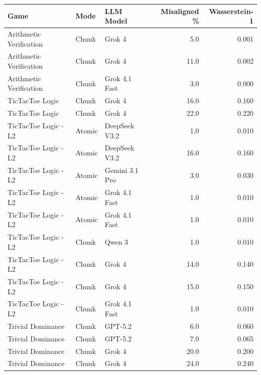 \normalsize
\setlength{\tabcolsep}{3pt}
\begin{tabular}{lllrr}
\toprule
Game & Mode & LLM Model & Misaligned \% & Wasserstein-1 \\
\midrule
Arithmetic Verification & Chunk & Grok 4 & 5.0 & 0.001 \\
Arithmetic Verification & Chunk & Grok 4 & 11.0 & 0.002 \\
Arithmetic Verification & Chunk & Grok 4.1 Fast & 3.0 & 0.000 \\
TicTacToe Logic & Chunk & Grok 4 & 16.0 & 0.160 \\
TicTacToe Logic & Chunk & Grok 4 & 22.0 & 0.220 \\
TicTacToe Logic - L2 & Atomic & DeepSeek V3.2 & 1.0 & 0.010 \\
TicTacToe Logic - L2 & Atomic & DeepSeek V3.2 & 16.0 & 0.160 \\
TicTacToe Logic - L2 & Atomic & Gemini 3.1 Pro & 3.0 & 0.030 \\
TicTacToe Logic - L2 & Atomic & Grok 4.1 Fast & 1.0 & 0.010 \\
TicTacToe Logic - L2 & Atomic & Grok 4.1 Fast & 1.0 & 0.010 \\
TicTacToe Logic - L2 & Chunk & Qwen 3 & 1.0 & 0.010 \\
TicTacToe Logic - L2 & Chunk & Grok 4 & 14.0 & 0.140 \\
TicTacToe Logic - L2 & Chunk & Grok 4 & 15.0 & 0.150 \\
TicTacToe Logic - L2 & Chunk & Grok 4.1 Fast & 1.0 & 0.010 \\
Trivial Dominance & Chunk & GPT-5.2 & 6.0 & 0.060 \\
Trivial Dominance & Chunk & GPT-5.2 & 7.0 & 0.065 \\
Trivial Dominance & Chunk & Grok 4 & 20.0 & 0.200 \\
Trivial Dominance & Chunk & Grok 4 & 24.0 & 0.240 \\
\bottomrule
\end{tabular}
